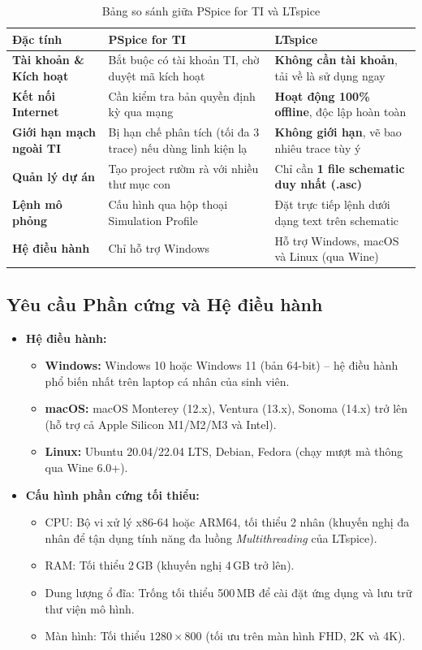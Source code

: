 \documentclass[11pt,a4paper]{article}
\begin{document}
\begin{table}[H]\centering\small
\caption{Bảng so sánh giữa PSpice for TI và LTspice}\label{tab:so-sanh}
\renewcommand{\arraystretch}{1.3}
\begin{tabularx}{\linewidth}{|p{3.5cm}|X|X|}\hline
\rowcolor{navy!15}\textbf{Đặc tính} & \textbf{PSpice for TI} & \textbf{LTspice} \\ \hline
\textbf{Tài khoản \& Kích hoạt} & Bắt buộc có tài khoản TI, chờ duyệt mã kích hoạt & \textbf{Không cần tài khoản}, tải về là sử dụng ngay \\ \hline
\textbf{Kết nối Internet} & Cần kiểm tra bản quyền định kỳ qua mạng & \textbf{Hoạt động 100\% offline}, độc lập hoàn toàn \\ \hline
\textbf{Giới hạn mạch ngoài TI} & Bị hạn chế phân tích (tối đa 3 trace) nếu dùng linh kiện lạ & \textbf{Không giới hạn}, vẽ bao nhiêu trace tùy ý \\ \hline
\textbf{Quản lý dự án} & Tạo project rườm rà với nhiều thư mục con & Chỉ cần \textbf{1 file schematic duy nhất (.asc)} \\ \hline
\textbf{Lệnh mô phỏng} & Cấu hình qua hộp thoại Simulation Profile & Đặt trực tiếp lệnh dưới dạng text trên schematic \\ \hline
\textbf{Hệ điều hành} & Chỉ hỗ trợ Windows & Hỗ trợ Windows, macOS và Linux (qua Wine) \\ \hline
\end{tabularx}
\end{table}

\subsection{Yêu cầu Phần cứng và Hệ điều hành}
\begin{itemize}[itemsep=2pt]
  \item \textbf{Hệ điều hành:}
  \begin{itemize}
    \item \textbf{Windows:} Windows 10 hoặc Windows 11 (bản 64-bit) -- hệ điều hành phổ biến nhất trên laptop cá nhân của sinh viên.
    \item \textbf{macOS:} macOS Monterey (12.x), Ventura (13.x), Sonoma (14.x) trở lên (hỗ trợ cả Apple Silicon M1/M2/M3 và Intel).
    \item \textbf{Linux:} Ubuntu 20.04/22.04 LTS, Debian, Fedora (chạy mượt mà thông qua Wine 6.0+).
  \end{itemize}
  \item \textbf{Cấu hình phần cứng tối thiểu:}
  \begin{itemize}
    \item CPU: Bộ vi xử lý x86-64 hoặc ARM64, tối thiểu 2 nhân (khuyến nghị đa nhân để tận dụng tính năng đa luồng \textit{Multithreading} của LTspice).
    \item RAM: Tối thiểu 2\,GB (khuyến nghị 4\,GB trở lên).
    \item Dung lượng ổ đĩa: Trống tối thiểu 500\,MB để cài đặt ứng dụng và lưu trữ thư viện mô hình.
    \item Màn hình: Tối thiểu $1280 \times 800$ (tối ưu trên màn hình FHD, 2K và 4K).
  \end{itemize}
\end{itemize}
\end{document}

